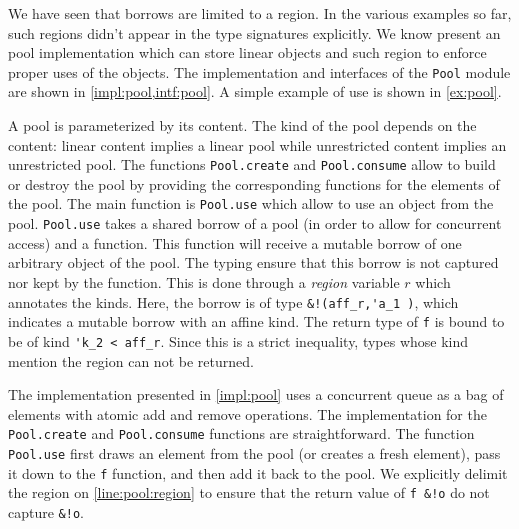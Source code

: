 We have seen that borrows are limited to a region. In the various examples so
far, such regions didn't appear in the type signatures explicitly.
We know present an pool implementation which can store linear objects
and such region to enforce proper uses of the objects.
The implementation and interfaces of the \texttt{Pool} module
are shown in \cref{impl:pool,intf:pool}. A simple example of use
is shown in \cref{ex:pool}. 

A pool is parameterized by its content. The kind of the pool
depends on the content: linear content implies
a linear pool while unrestricted content implies an unrestricted pool.
The functions \lstinline/Pool.create/ and \lstinline/Pool.consume/ allow
to build or destroy
the pool by providing the corresponding functions for the elements
of the pool.
The main function is \lstinline/Pool.use/ which
allow to use an object from the pool.
\lstinline/Pool.use/ takes a shared borrow of a pool (in order to allow
for concurrent access) and a function. This function will receive
a mutable borrow of one arbitrary object of the pool. The typing ensure
that this borrow is not captured nor kept by the function.
This is done through a \emph{region} variable $r$ which annotates
the kinds. Here, the borrow is of type \lstinline/&!(aff_r,'a_1 )/, which indicates
a mutable borrow with an affine kind. The return type of \lstinline/f/ is bound
to be of kind \lstinline/'k_2 < aff_r/. Since this is a strict inequality,
types whose kind mention the region can not be returned.

The implementation presented in \cref{impl:pool} uses a concurrent queue
as a bag of elements with atomic add and remove operations.
The implementation for the \lstinline/Pool.create/ and \lstinline/Pool.consume/
functions are straightforward.
The function \lstinline/Pool.use/ first draws
an element from the pool (or creates a fresh element),
pass it down to the \lstinline/f/ function, and then add
it back to the pool.
We explicitly delimit the region on \cref{line:pool:region} to ensure that
the return value of \lstinline/f &!o/ do not capture \lstinline/&!o/.

